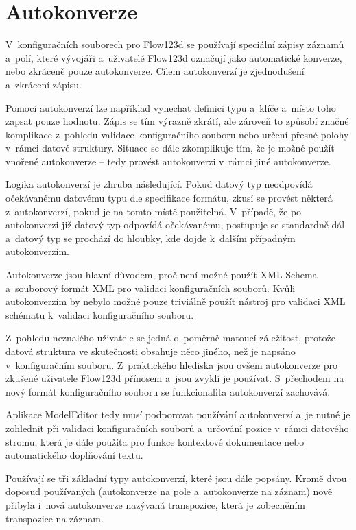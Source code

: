 \documentclass[FM,bw,DP]{tulthesis}
\begin{document}
\section{Autokonverze}
\label{sec:analyza-autokonverze}

V~konfiguračních souborech pro Flow123d se používají speciální zápisy záznamů a~polí, které vývojáři a~uživatelé Flow123d označují jako automatické konverze, nebo zkráceně pouze autokonverze. Cílem autokonverzí je zjednodušení a~zkrácení zápisu.

Pomocí autokonverzí lze například vynechat definici typu a~klíče a~místo toho zapsat pouze hodnotu. Zápis se tím výrazně zkrátí, ale zároveň to způsobí značné komplikace z~pohledu validace konfiguračního souboru nebo určení přesné polohy v~rámci datové struktury. Situace se dále zkomplikuje tím, že je možné použít vnořené autokonverze -- tedy provést autokonverzi v~rámci jiné autokonverze.

Logika autokonverzí je zhruba následující. Pokud datový typ neodpovídá očekávanému datovému typu dle specifikace formátu, zkusí se provést některá z~autokonverzí, pokud je na tomto místě použitelná. V~případě, že po autokonverzi již datový typ odpovídá očekávanému, postupuje se standardně dál a~datový typ se prochází do hloubky, kde dojde k~dalším případným autokonverzím.

Autokonverze jsou hlavní důvodem, proč není možné použít XML Schema a~souborový formát XML pro validaci konfiguračních souborů. Kvůli autokonverzím by nebylo možné pouze triviálně použít nástroj pro validaci XML schématu k~validaci konfiguračního souboru.

Z~pohledu neznalého uživatele se jedná o~poměrně matoucí záležitost, protože datová struktura ve skutečnosti obsahuje něco jiného, než je napsáno v~konfiguračním souboru. Z~praktického hlediska jsou ovšem autokonverze pro zkušené uživatele Flow123d přínosem a~jsou zvyklí je používat. S~přechodem na nový formát konfiguračního souboru se funkcionalita autokonverzí zachovává.

Aplikace ModelEditor tedy musí podporovat používání autokonverzí a~je nutné je zohlednit při validaci konfiguračních souborů a~určování pozice v~rámci datového stromu, která je dále použita pro funkce kontextové dokumentace nebo automatického doplňování textu. 

Používají se tři základní typy autokonverzí, které jsou dále popsány. Kromě dvou doposud používaných (autokonverze na pole a~autokonverze na záznam) nově přibyla i~nová autokonverze nazývaná transpozice, která je zobecněním transpozice na záznam.
\end{document}
